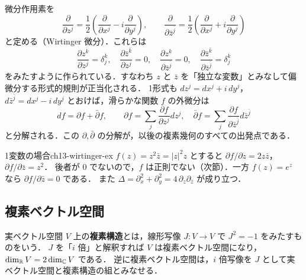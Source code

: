 微分作用素を
\begin{equation}
  \frac{\partial}{\partial z^j} = \frac12\left(\frac{\partial}{\partial x^j} - i\frac{\partial}{\partial y^j}\right),\qquad
  \frac{\partial}{\partial \bar z^{\bar j}} = \frac12\left(\frac{\partial}{\partial x^j} + i\frac{\partial}{\partial y^j}\right)
  \label{eq:ch13-wirtinger}
\end{equation}
と定める（Wirtinger 微分）．これらは
\begin{equation}
  \frac{\partial z^k}{\partial z^j}=\delta^k_j,\quad
  \frac{\partial \bar z^{\bar k}}{\partial z^j}=0,\quad
  \frac{\partial z^k}{\partial \bar z^{\bar j}}=0,\quad
  \frac{\partial \bar z^{\bar k}}{\partial \bar z^{\bar j}}=\delta^{k}_{j}
\end{equation}
をみたすように作られている．すなわち $z$ と $\bar z$ を「独立な変数」とみなして偏微分する形式的規則が正当化される．
1形式も $dz^j=dx^j+i\,dy^j$，$d\bar z^{\bar j}=dx^j-i\,dy^j$ とおけば，滑らかな関数 $f$ の外微分は
\begin{equation}
  df = \partial f + \bar\partial f,\qquad
  \partial f = \sum_j \frac{\partial f}{\partial z^j}dz^j,\quad
  \bar\partial f = \sum_j \frac{\partial f}{\partial \bar z^{\bar j}}d\bar z^{\bar j}
\end{equation}
と分解される．この $\partial,\bar\partial$ の分解が，以後の複素幾何のすべての出発点である．

\begin{myex}{1変数の場合}{ch13-wirtinger-ex}
$f(z)=z^2\bar z = |z|^2 z$ とすると $\partial f/\partial z = 2z\bar z$，$\partial f/\partial\bar z = z^2$．
後者が $0$ でないので，$f$ は正則でない（次節）．一方 $f(z)=e^{z}$ なら $\partial f/\partial\bar z=0$ である．
また $\Delta = \partial_x^2+\partial_y^2 = 4\,\partial_z\partial_{\bar z}$ が成り立つ．
\end{myex}

\subsection{複素ベクトル空間}

実ベクトル空間 $V$ 上の\textbf{複素構造}とは，線形写像 $J:V\to V$ で $J^2=-1$ をみたすものをいう．
$J$ を「$i$ 倍」と解釈すれば $V$ は複素ベクトル空間になり，$\dim_{\mathbb{R}} V = 2\dim_{\mathbb{C}} V$ である．
逆に複素ベクトル空間は，$i$ 倍写像を $J$ として実ベクトル空間と複素構造の組とみなせる．

